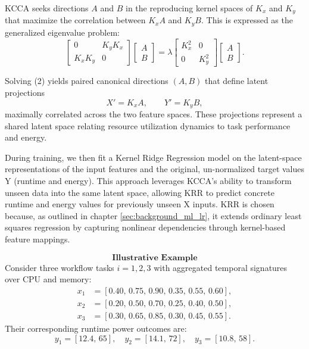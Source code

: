 KCCA seeks directions \(A\) and \(B\) in the
reproducing kernel spaces of \(K_x\) and \(K_y\)
that maximize the correlation between
\( K_x A \) and \( K_y B \).
This is expressed as the generalized eigenvalue problem:
\[
    \begin{bmatrix}
        0       & K_y K_x \\
        K_x K_y & 0
    \end{bmatrix}
    \begin{bmatrix}
        A \\ B
    \end{bmatrix}
    =
    \lambda
    \begin{bmatrix}
        K_x^2 & 0     \\
        0     & K_y^2
    \end{bmatrix}
    \begin{bmatrix}
        A \\ B
    \end{bmatrix}.
    \tag{2}
\]

Solving (2) yields paired canonical directions
\( (A, B) \) that define latent projections
\[
    X' = K_x A, \qquad Y' = K_y B,
\]
maximally correlated across the two feature spaces.
These projections represent a shared latent space
relating resource utilization dynamics to task performance and energy.

During training, we then fit a Kernel Ridge Regression model on the latent-space representations of the input features and the original, un-normalized target values Y (runtime and energy). This approach leverages KCCA's ability to transform unseen data into the same latent space, allowing KRR to predict concrete runtime and energy values for previously unseen X inputs. KRR is chosen because, as outlined in chapter \ref{sec:background_ml_lr}, it extends ordinary least squares regression by capturing nonlinear dependencies through kernel-based feature mappings.

\[
    \textbf{Illustrative Example}
\]
Consider three workflow tasks \( i = 1, 2, 3 \)
with aggregated temporal signatures over CPU and memory:
\[
    \begin{aligned}
        x_1 & = [0.40,\, 0.75,\, 0.90,\, 0.35,\, 0.55,\, 0.60], \\
        x_2 & = [0.20,\, 0.50,\, 0.70,\, 0.25,\, 0.40,\, 0.50], \\
        x_3 & = [0.30,\, 0.65,\, 0.85,\, 0.30,\, 0.45,\, 0.55].
    \end{aligned}
\]
Their corresponding runtime power outcomes are:
\[
    y_1 = [12.4,\, 65], \quad
    y_2 = [14.1,\, 72], \quad
    y_3 = [10.8,\, 58].
\]

